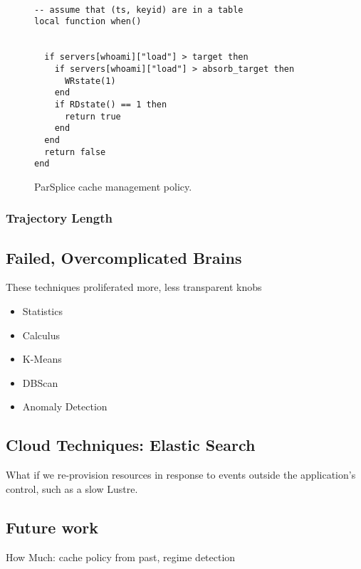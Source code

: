 \begin{figure}[tb]
\begin{verbatim}

-- assume that (ts, keyid) are in a table
local function when()
  

  if servers[whoami]["load"] > target then
    if servers[whoami]["load"] > absorb_target then
      WRstate(1)
    end
    if RDstate() == 1 then
      return true
    end
  end
  return false
end
\end{verbatim}
\caption{ParSplice cache management policy.\label{lua:parsplice}}
\end{figure}



\subsubsection{Trajectory Length}

\subsection{Failed, Overcomplicated Brains}
These techniques proliferated more, less transparent knobs
\begin{itemize}
  \item Statistics
  \item Calculus
  \item K-Means
  \item DBScan
  \item Anomaly Detection
\end{itemize}


\subsection{Cloud Techniques: Elastic Search}

What if we re-provision resources in response to events outside the
application's control, such as a slow Lustre.

\subsection{Future work}

How Much: cache policy from past, regime detection
